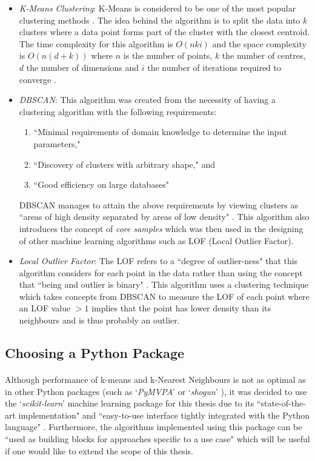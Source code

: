 \documentclass[12pt, twoside]{report}
\begin{document}
	\begin{itemize}
		\item \textit{K-Means Clustering}: K-Means is considered to be one of the most popular clustering methods \cite{r:jin}. The idea behind the algorithm is to split the data into $k$ clusters where a data point forms part of the cluster with the closest centroid. The time complexity for this algorithm is $O(nki)$ and the space complexity is $O(n(d+k))$ where $n$ is the number of points, $k$ the number of centres, $d$ the number of dimensions and $i$ the number of iterations required to converge \cite{r:jin}. 
		\item \textit{DBSCAN}: This algorithm was created from the necessity of having a clustering algorithm with the following requirements:
		\begin{enumerate}
			\item ``Minimal requirements of domain knowledge to determine the input parameters,"
			\item ``Discovery of clusters with arbitrary shape," and
			\item ``Good efficiency on large databases" \cite{r:DBSCAN}
		\end{enumerate}
		DBSCAN manages to attain the above requirements by viewing clusters as ``areas of high density separated by areas of low density" \cite{r:skclustering}. This algorithm also introduces the concept of \textit{core samples} which was then used in the designing of other machine learning algorithms such as LOF (Local Outlier Factor).
		\item \textit{Local Outlier Factor}: The LOF refers to a ``degree of outlier-ness" that this algorithm considers for each point in the data rather than using the concept that ``being and outlier is binary" \cite{r:LOF}. This algorithm uses a clustering technique which takes concepts from DBSCAN to measure the LOF of each point where an LOF value $>1$ implies that the point has lower density than its neighbours and is thus probably an outlier. 	
	\end{itemize}
	
		
	\subsection{Choosing a Python Package}
	\paragraph{ }Although performance of k-means and k-Nearest Neighbours is not as optimal as in other Python packages (such as `\textit{PyMVPA}' \cite{r:pymvpa} or `\textit{shogun}' \cite{r:shogun}), it was decided to use the `\textit{scikit-learn}' machine learning package for this thesis due to its ``state-of-the-art implementation" and ``easy-to-use interface tightly integrated with the Python language" \cite{r:sklearn}. Furthermore, the algorithms implemented using this package can be ``used as building blocks for approaches specific to a use case" \cite{r:sklearn} which will be useful if one would like to extend the scope of this thesis.
	
\end{document}
